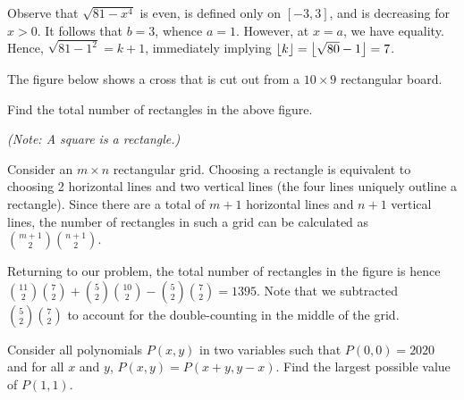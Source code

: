 Observe that $\sqrt{81 - x^4}$ is even, is defined only on $[-3, 3]$, and is decreasing for $x > 0$. It follows that $b = 3$, whence $a = 1$. However, at $x = a$, we have equality. Hence, $\sqrt{81 - 1^2} = k + 1$, immediately implying $\left\lfloor k \right\rfloor = \left\lfloor \sqrt{80} - 1 \right\rfloor = 7$.

\begin{question}[1395]\label{A::2021-O-1-5}
    The figure below shows a cross that is cut out from a $10 \times 9$ rectangular board.

    \begin{center}
    \end{center} Find the total number of rectangles in the above figure.

    \noindent\textit{(Note: A square is a rectangle.)}
\end{question}

Consider an $m \times n$ rectangular grid. Choosing a rectangle is equivalent to choosing 2 horizontal lines and two vertical lines (the four lines uniquely outline a rectangle). Since there are a total of $m+1$ horizontal lines and $n+1$ vertical lines, the number of rectangles in such a grid can be calculated as $\binom{m+1}{2} \binom{n+1}{2}$.

Returning to our problem, the total number of rectangles in the figure is hence $\binom{11}{2} \binom{7}{2} + \binom{5}{2} \binom{10}{2} - \binom{5}{2} \binom{7}{2} = 1395$. Note that we subtracted $\binom{5}{2} \binom{7}{2}$ to account for the double-counting in the middle of the grid.

\begin{question}[2020]\label{A::2021-O-1-6}
    Consider all polynomials $P(x, y)$ in two variables such that $P(0, 0) = 2020$ and for all $x$ and $y$, $P(x, y) = P(x + y, y - x)$. Find the largest possible value of $P(1, 1)$.
\end{question}


